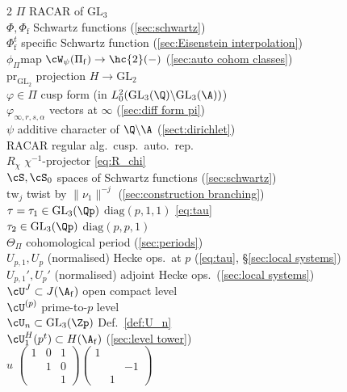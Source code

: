 \documentclass[10pt,reqno,a4paper]{amsart}
\newcommand{\Pif}{\Pi\subf}
\newcommand{\Phif}{{\Phi\subf}}
\newcommand{\subf}{_{\mathrm{f}}}
\newcommand{\GL}{\mathrm{GL}}
\newcommand{\smallthreemat}[9]{\left(\begin{smallmatrix}
#1 & #2 & #3 \\
#4 & #5 & #6 \\
#7 & #8 & #9\end{smallmatrix}\right)}
\begin{document}
\begin{multicols}{2}
	$\Pi$ \dotfill RACAR of $\GL_3$\\
	$\Phi, \Phif$ \dotfill Schwartz functions (\cref{sec:schwartz})\\
	$\Phi\subf^t$ \dotfill specific Schwartz function (\cref{sec:Eisenstein interpolation})\\
	$\phi_\Pi$\dotfill map $\cW_\psi(\Pif) \to \hc{2}(-)$ (\cref{sec:auto cohom classes}) \\
	$\mathrm{pr}_{\GL_2}$ \dotfill projection $H \to \GL_2$\\
	$\varphi \in \Pi$ \dotfill cusp form (in $L^2_0(\GL_3(\Q)\backslash\GL_3(\A))$)\\
	$\varphi_{\infty,r,s,\alpha}$ \dotfill vectors at $\infty$ (\cref{sec:diff form pi})\\
	$\psi$ \dotfill additive character of $\Q\backslash\A$ (\cref{sect:dirichlet})\\
	RACAR \dotfill regular alg.\ cusp.\ auto.\ rep.\\
	$R_\chi$ \dotfill $\chi^{-1}$-projector \eqref{eq:R_chi}\\
	$\cS,\cS_0$ \dotfill spaces of Schwartz functions (\cref{sec:schwartz})\\
	$\mathrm{tw}_j$ \dotfill twist by $\|\nu_1\|^{-j}$ (\cref{sec:construction branching})\\
	$\tau = \tau_1 \in \GL_3(\Qp)$ \dotfill $\mathrm{diag}(p,1,1)$ \eqref{eq:tau}\\
		$\tau_2 \in \GL_3(\Qp)$ \dotfill $\mathrm{diag}(p,p,1)$\\
	$\Theta_\Pi$ \dotfill cohomological period (\cref{sec:periods})\\
	$U_{p,1},U_p$ \dotfill (normalised) Hecke ops.\ at $p$ (\eqref{eq:tau}, \S\ref{sec:local systems})\\
	$U_{p,1}',U_p'$ \dotfill (normalised) adjoint Hecke ops.\  (\cref{sec:local systems})\\
	$\cU^J \subset J(\A\subf)$ \dotfill open compact level\\
	$\cU^{(p)}$ \dotfill prime-to-$p$ level\\
	$\cU_n \subset \GL_3(\Zp)$ \dotfill Def.\ \ref{def:U_n}\\
	$\cU_1^H(p^t) \subset H(\A\subf)$ \dotfill (\cref{sec:level tower})\\
	$u$ \dotfill $\smallthreemat{1}{0}{1}{}{1}{0}{}{}{1}\smallthreemat{1}{}{}{}{}{-1}{}{1}{}$\\

\end{multicols}
\end{document}
